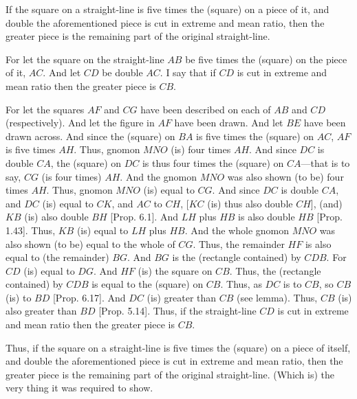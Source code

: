 \begin{Parallel}{}{}
{If the square on a straight-line is five times the (square) on a piece of
it, and  double the aforementioned piece is cut in extreme and
mean ratio, then the greater piece  is  the remaining part of the
original straight-line. 

\epsfysize=2.5in
\centerline{}

For let the square on the straight-line $AB$ be five times the (square)
on the piece of it, $AC$. And let $CD$ be double $AC$. I say that
if $CD$ is cut in extreme and mean ratio then the greater piece
is $CB$. 

For let the squares $AF$ and $CG$ have been described on each of
$AB$ and $CD$ (respectively). And let the figure  in $AF$ have been drawn.
And let $BE$ have been drawn across. And since the (square) on $BA$
is five times the (square) on $AC$, $AF$ is five times $AH$. 
Thus, gnomon $MNO$ (is) four times $AH$. 
And since
$DC$ is double $CA$, the (square) on $DC$ is thus four times the (square)
on $CA$---that is to say, $CG$ (is four times) $AH$. And the gnomon
$MNO$ was also shown (to be) four times $AH$. Thus, gnomon $MNO$
(is) equal to $CG$. And since $DC$ is double $CA$, and $DC$
(is) equal to $CK$, and $AC$ to $CH$, [$KC$ (is) thus also double $CH$], (and) $KB$ (is) also double $BH$
[Prop. 6.1]. And $LH$ plus $HB$ is also double $HB$ [Prop. 1.43].
Thus, $KB$ (is) equal to $LH$ plus $HB$. And the whole gnomon
$MNO$ was also shown (to be) equal to the whole of $CG$. Thus, the
remainder $HF$ is also equal to (the remainder) $BG$.  And $BG$
is the (rectangle contained) by $CDB$. For  $CD$ (is) equal to $DG$.
And $HF$ (is) the square on $CB$. Thus, the (rectangle contained)
by $CDB$ is equal to the (square) on $CB$. Thus, as $DC$ is to $CB$,
so $CB$ (is) to $BD$ [Prop. 6.17]. And $DC$ (is) greater than $CB$ (see lemma). Thus, $CB$ (is) also greater than $BD$ [Prop. 5.14]. Thus, if the
straight-line $CD$ is cut in extreme and mean ratio then the greater piece is $CB$.

Thus, if the square on a straight-line is five times the (square) on a piece of
itself, and  double the aforementioned piece is cut in extreme and
mean ratio, then the greater piece is the remaining part of the
original straight-line.  (Which is) the very thing it was required to show.}
\end{Parallel}

